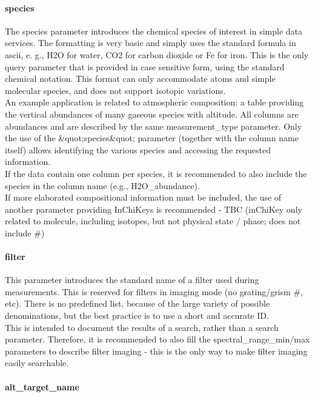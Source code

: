 \documentclass[11pt,a4paper]{ivoa}
\begin{document}
\paragraph{species}

The species parameter introduces the chemical species of interest in simple data services. The formatting is very basic and simply uses the standard formula in ascii, e. g., H2O for water, CO2 for carbon dioxide or Fe for iron. This is the only query parameter that is provided in case sensitive form, using the standard chemical notation. This format can only accommodate atoms and simple molecular species, and does not support isotopic variations. \\ An example application is related to atmospheric composition: a table providing the vertical abundances of many gaseous species with altitude. All columns are abundances and are described by the same measurement\_type parameter. Only the use of the \&quot;species\&quot; parameter (together with the column name itself) allows identifying the various species and accessing the requested information.\\ If the data contain one column per species, it is recommended to also include the species in the column name (e.g., H2O\_abundance). \\ If more elaborated compositional information must be included, the use of another parameter providing InChiKeys is recommended - TBC (inChiKey only related to molecule, including isotopes, but not physical state / phase; does not include \#)\\

\paragraph{filter}

This parameter introduces the standard name of a filter used during measurements. This is reserved for filters in imaging mode (no grating/grism \#, etc). There is no predefined list, because of the large variety of possible denominations, but the best practice is to use a short and accurate ID.\\This is intended to document the results of a search, rather than a search parameter. Therefore, it is recommended to also fill the spectral\_range\_min/max parameters to describe filter imaging - this is the only way to make filter imaging easily searchable. 

\paragraph{alt\_target\_name}
\end{document}
